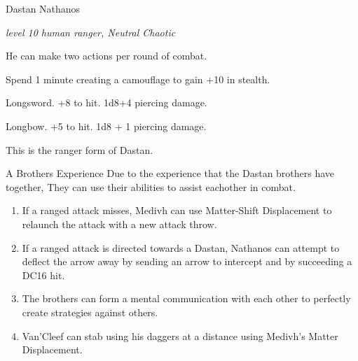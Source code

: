 \begin{monsterbox}{Dastan Nathanos}
	\begin{hangingpar}
		\textit{level 10 human ranger, Neutral Chaotic}
	\end{hangingpar}
	\dndline%
	\basics[%
	armorclass = 16,
	hitpoints  = 85,
	speed      = 40 ft
	]
	\dndline%
	\stats[
	STR = \stat{18}, %
	DEX = \stat{13},
	CON = \stat{12},
	INT = \stat{11},
	WIS = \stat{14},
	CHA = \stat{12}
	]
	\dndline%
	\details[%
	languages = {Common, Elvish, Dwarvish, Gnomish, Halfling, Celestial, Draconic, Primordial},
	challenge = 10
	]
	\dndline%
	\begin{monsteraction}
		He can make two actions per round of combat.
	\end{monsteraction}	
	\begin{monsteraction}
		Spend 1 minute creating a camouflage to gain +10 in stealth.
	\end{monsteraction}	
	\begin{monsteraction}[Melee]
		Longsword. +8 to hit. 1d8+4 piercing damage. 
	\end{monsteraction}
	\begin{monsteraction}[Ranged]
		Longbow. +5 to hit. 1d8 + 1 piercing damage.
	\end{monsteraction}
	This is the ranger form of Dastan.
\end{monsterbox}

\begin{commentbox}{A Brothers Experience}
	Due to the experience that the Dastan brothers have together, They can use their abilities to assist eachother in combat.
	\begin{enumerate}
		\item  If a ranged attack misses, Medivh can use Matter-Shift Displacement to relaunch the attack with a new attack throw.
		\item If a ranged attack is directed towards a Dastan, Nathanos can attempt to deflect the arrow away by sending an arrow to intercept and by succeeding a DC16 hit.
		\item The brothers can form a mental communication with each other to perfectly create strategies against others.
		\item Van'Cleef can stab using his daggers at a distance using Medivh's Matter Displacement.
	\end{enumerate}
\end{commentbox}